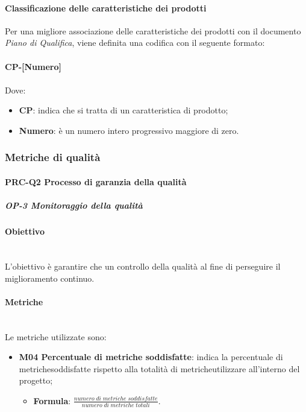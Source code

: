 \paragraph{Classificazione delle caratteristiche dei prodotti}
Per una migliore associazione delle caratteristiche dei prodotti con il documento \textit{Piano di Qualifica}, viene definita una codifica con il seguente formato: \\
\\ \textbf{CP-[Numero]} \\
\\ Dove:
\begin{itemize}
	\item \textbf{CP}: indica che si tratta di un caratteristica di prodotto;
	\item \textbf{Numero}: è un numero intero progressivo maggiore di zero.
\end{itemize}

\subsubsection{Metriche di qualità}
	\paragraph{PRC-Q2 Processo di garanzia della qualità}
	\subparagraph{OP-3 Monitoraggio della qualità}
		\paragraph*{Obiettivo}\mbox{}\\ [1mm]
		L'obiettivo è garantire che un controllo della qualità al fine di perseguire il miglioramento continuo.
		\paragraph*{Metriche}\mbox{}\\ [1mm]
		Le metriche utilizzate sono:
			\begin{itemize}
				\item \textbf{M04 Percentuale di metriche soddisfatte}: indica la percentuale di metriche\glosp soddisfatte rispetto alla totalità di metriche\glosp utilizzare all'interno del progetto\glo;
				\begin{itemize}
					\item[] \textbf{Formula}: $\frac{numero \; di \; metriche \; soddisfatte}{numero \; di \; metriche \; totali}$.
				\end{itemize}
			\end{itemize}
